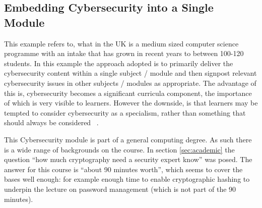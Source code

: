 \documentclass[conference]{IEEEtran}
\begin{document}
\subsection{Embedding Cybersecurity into a Single Module}\label{sec:second} %
This example refers to, what in the UK is a medium sized computer science programme with an intake that has grown in recent years to between 100-120 students. In this example the approach adopted is to primarily deliver the cybersecurity content within a single subject / module and then signpost relevant  cybersecurity issues in other subjects / modules as appropriate. The advantage of this is, cybersecurity becomes a significant curricula component, the importance of which is very visible to learners. However the downside, is that learners may be tempted to consider cybersecurity as a specialism, rather than something that should always be considered~ \cite{Naiakshinaetal2017a}.

This Cybersecurity module is part of a general computing degree. As such there is a wide range of backgrounds on the course. In section \ref{sec:academic} the question ``how much cryptography need a security expert know'' was posed. The answer for this course is ``about 90 minutes worth'', which seems to cover the bases well enough: for example enough time to enable  cryptographic hashing to underpin the lecture on password management (which is not part of the 90 minutes).
\end{document}
